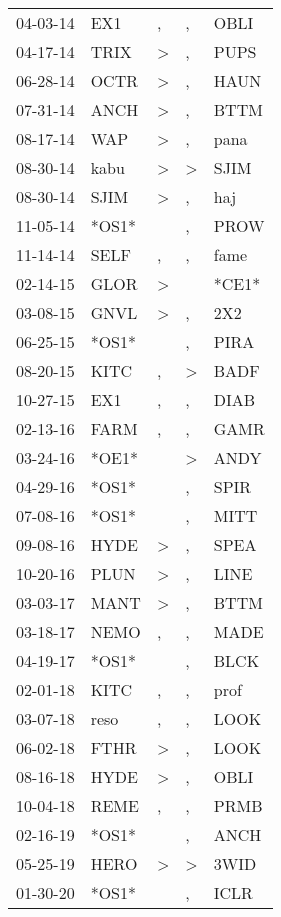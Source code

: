 \begin{supertabular}{lllll}
 04-03-14 &    EX1 &                , &             , &   OBLI \\
 04-17-14 &   TRIX &     \textgreater &             , &   PUPS \\
 06-28-14 &   OCTR &     \textgreater &             , &   HAUN \\
 07-31-14 &   ANCH &     \textgreater &             , &   BTTM \\
 08-17-14 &    WAP &     \textgreater &             , &   pana \\
 08-30-14 &   kabu &     \textgreater &  \textgreater &   SJIM \\
 08-30-14 &   SJIM &     \textgreater &             , &    haj \\
 11-05-14 &  *OS1* &                  &             , &   PROW \\
 11-14-14 &   SELF &                , &             , &   fame \\
 02-14-15 &   GLOR &     \textgreater &               &  *CE1* \\
 03-08-15 &   GNVL &     \textgreater &             , &    2X2 \\
 06-25-15 &  *OS1* &                  &             , &   PIRA \\
 08-20-15 &   KITC &                , &  \textgreater &   BADF \\
 10-27-15 &    EX1 &                , &             , &   DIAB \\
 02-13-16 &   FARM &                , &             , &   GAMR \\
 03-24-16 &  *OE1* &                  &  \textgreater &   ANDY \\
 04-29-16 &  *OS1* &                  &             , &   SPIR \\
 07-08-16 &  *OS1* &                  &             , &   MITT \\
 09-08-16 &   HYDE &     \textgreater &             , &   SPEA \\
 10-20-16 &   PLUN &     \textgreater &             , &   LINE \\
 03-03-17 &   MANT &     \textgreater &             , &   BTTM \\
 03-18-17 &   NEMO &                , &             , &   MADE \\
 04-19-17 &  *OS1* &                  &             , &   BLCK \\
 02-01-18 &   KITC &                , &             , &   prof \\
 03-07-18 &   reso &                , &             , &   LOOK \\
 06-02-18 &   FTHR &     \textgreater &             , &   LOOK \\
 08-16-18 &   HYDE &     \textgreater &             , &   OBLI \\
 10-04-18 &   REME &                , &             , &   PRMB \\
 02-16-19 &  *OS1* &                  &             , &   ANCH \\
 05-25-19 &   HERO &     \textgreater &  \textgreater &   3WID \\
 01-30-20 &  *OS1* &                  &             , &   ICLR \\
\end{supertabular}
